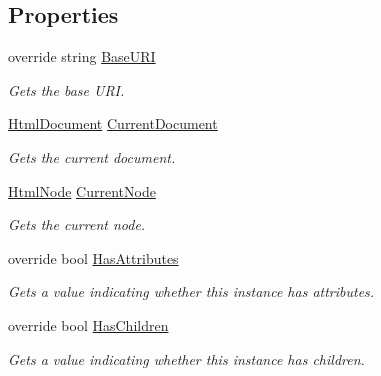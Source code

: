 \subsection*{Properties}
\begin{DoxyCompactItemize}
\item 
override string \hyperlink{class_html_agility_pack_1_1_html_node_navigator_a2c24da5b005cf63b1adaa7f7d3955645}{Base\+U\+RI}
\begin{DoxyCompactList}\small\item\em Gets the base U\+RI. \end{DoxyCompactList}\item 
\hyperlink{class_html_agility_pack_1_1_html_document}{Html\+Document} \hyperlink{class_html_agility_pack_1_1_html_node_navigator_a8c0c374c8b98852a22d065c4d2391056}{Current\+Document}
\begin{DoxyCompactList}\small\item\em Gets the current document. \end{DoxyCompactList}\item 
\hyperlink{class_html_agility_pack_1_1_html_node}{Html\+Node} \hyperlink{class_html_agility_pack_1_1_html_node_navigator_a16b7cbfe1c355ae5163e7feaf2438878}{Current\+Node}
\begin{DoxyCompactList}\small\item\em Gets the current node. \end{DoxyCompactList}\item 
override bool \hyperlink{class_html_agility_pack_1_1_html_node_navigator_a9cf1709cc0950d62e95b78c10a95d7b9}{Has\+Attributes}
\begin{DoxyCompactList}\small\item\em Gets a value indicating whether this instance has attributes. \end{DoxyCompactList}\item 
override bool \hyperlink{class_html_agility_pack_1_1_html_node_navigator_a552171940539c328a39d0ba158950155}{Has\+Children}
\begin{DoxyCompactList}\small\item\em Gets a value indicating whether this instance has children. \end{DoxyCompactList}\item 

\end{DoxyCompactItemize}
